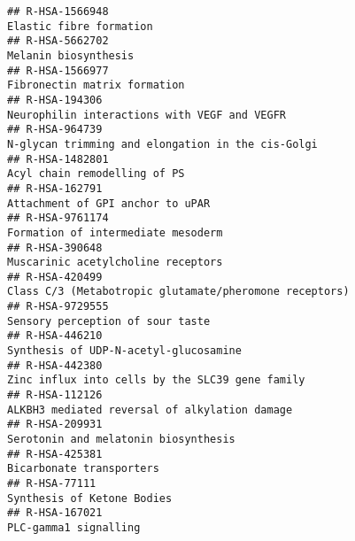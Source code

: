 \documentclass[
]{article}
\begin{document}
\begin{verbatim}
## R-HSA-1566948                                                                                                              Elastic fibre formation
## R-HSA-5662702                                                                                                                 Melanin biosynthesis
## R-HSA-1566977                                                                                                         Fibronectin matrix formation
## R-HSA-194306                                                                                          Neurophilin interactions with VEGF and VEGFR
## R-HSA-964739                                                                                     N-glycan trimming and elongation in the cis-Golgi
## R-HSA-1482801                                                                                                         Acyl chain remodelling of PS
## R-HSA-162791                                                                                                      Attachment of GPI anchor to uPAR
## R-HSA-9761174                                                                                                   Formation of intermediate mesoderm
## R-HSA-390648                                                                                                    Muscarinic acetylcholine receptors
## R-HSA-420499                                                                                Class C/3 (Metabotropic glutamate/pheromone receptors)
## R-HSA-9729555                                                                                                     Sensory perception of sour taste
## R-HSA-446210                                                                                                 Synthesis of UDP-N-acetyl-glucosamine
## R-HSA-442380                                                                                       Zinc influx into cells by the SLC39 gene family
## R-HSA-112126                                                                                         ALKBH3 mediated reversal of alkylation damage
## R-HSA-209931                                                                                                  Serotonin and melatonin biosynthesis
## R-HSA-425381                                                                                                              Bicarbonate transporters
## R-HSA-77111                                                                                                             Synthesis of Ketone Bodies
## R-HSA-167021                                                                                                                 PLC-gamma1 signalling

\end{verbatim}
\end{document}
